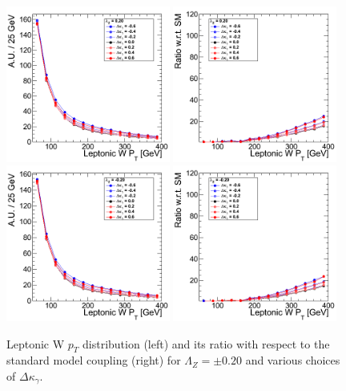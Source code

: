 \begin{figure}[h!t]
  {\centering
    \includegraphics[width=0.48\textwidth]{figs/LeptonicWpT_020.png}
    \includegraphics[width=0.48\textwidth]{figs/LeptonicWpT_020_ratio.png}
    \includegraphics[width=0.48\textwidth]{figs/LeptonicWpT_m020.png}
    \includegraphics[width=0.48\textwidth]{figs/LeptonicWpT_m020_ratio.png}
    \caption{Leptonic W $p_T$ distribution (left) and its ratio with respect to 
    the standard model coupling (right) for $\Lambda_Z = \pm 0.20$ and various choices of $\Delta{\kappa_\gamma}$.}
    \label{fig:ww_LeptonicWpT_atgcRatio020}}
\end{figure}
